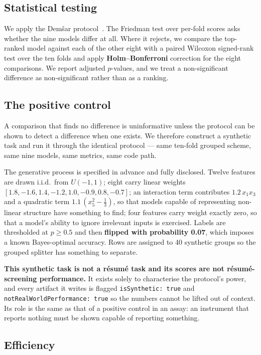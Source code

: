 \documentclass[11pt]{article}                      %
\begin{document}
\subsection{Statistical testing}

We apply the Dem\v{s}ar protocol~\cite{demsar2006statistical}. The Friedman test
over per-fold scores asks whether the nine models differ at all. Where it
rejects, we compare the top-ranked model against each of the other eight with a
paired Wilcoxon signed-rank test over the ten folds and apply
\textbf{Holm--Bonferroni} correction for the eight comparisons. We report
adjusted $p$-values, and we treat a non-significant difference as
non-significant rather than as a ranking.

\subsection{The positive control}
\label{sec:control}

A comparison that finds no difference is uninformative unless the protocol can be
shown to detect a difference when one exists. We therefore construct a synthetic
task and run it through the identical protocol --- same ten-fold grouped scheme,
same nine models, same metrics, same code path.

The generative process is specified in advance and fully disclosed. Twelve
features are drawn i.i.d.\ from $U(-1, 1)$; eight carry linear weights
$[1.8, -1.6, 1.4, -1.2, 1.0, -0.9, 0.8, -0.7]$; an interaction term contributes
$1.2\,x_1x_3$ and a quadratic term $1.1\,(x_5^2 - \tfrac{1}{3})$, so that models
capable of representing non-linear structure have something to find; four
features carry weight exactly zero, so that a model's ability to ignore
irrelevant inputs is exercised. Labels are thresholded at $p \geq 0.5$ and then
\textbf{flipped with probability 0.07}, which imposes a known Bayes-optimal
accuracy. Rows are assigned to 40 synthetic groups so the grouped splitter has
something to separate.

\textbf{This synthetic task is not a résumé task and its scores are not
résumé-screening performance.} It exists solely to characterise the protocol's
power, and every artifact it writes is flagged \texttt{isSynthetic: true} and
\texttt{notRealWorldPerformance: true} so the numbers cannot be lifted out of
context. Its role is the same as that of a positive control in an assay: an
instrument that reports nothing must be shown capable of reporting something.

\subsection{Efficiency}
\end{document}
